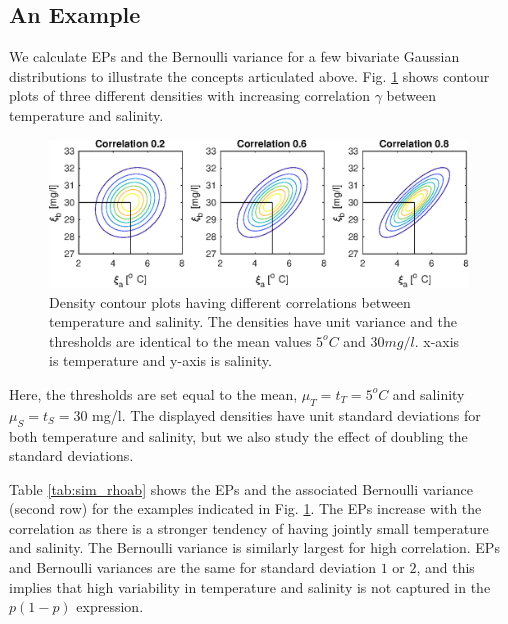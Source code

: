 \documentclass[aoas]{imsart}
\begin{document}
\subsection{An Example}

We calculate EPs and the Bernoulli variance for a few bivariate
Gaussian distributions to illustrate the concepts articulated above.
Fig. \ref{illus_bivarDens} shows contour plots of three different
densities with increasing correlation $\gamma$ between temperature and
salinity.
\begin{figure}[h!] \centering
  \includegraphics[width=0.99\textwidth]{Figures/illus_bivar.eps}
  \caption{Density contour plots having different correlations between
    temperature and salinity. The densities have unit variance and the
    thresholds are identical to the mean values $5^o C$ and
    $30 mg/l$. x-axis is temperature and y-axis is salinity.}
\label{illus_bivarDens}
\end{figure}
Here, the thresholds are set equal to the mean, $\mu_T=t_T=5^o C$ and
salinity $\mu_S=t_S=30$ mg/l. The displayed densities have unit
standard deviations for both temperature and salinity, but we also
study the effect of doubling the standard deviations.

Table \ref{tab:sim_rhoab} shows the EPs and the associated Bernoulli
variance (second row) for the examples indicated in
Fig. \ref{illus_bivarDens}. The EPs increase with the correlation as
there is a stronger tendency of having jointly small temperature and
salinity. The Bernoulli variance is similarly largest for high
correlation. EPs and Bernoulli variances are the same for standard
deviation $1$ or $2$, and this implies that high variability in
temperature and salinity is not captured in the $p(1-p)$ expression.
\end{document}
